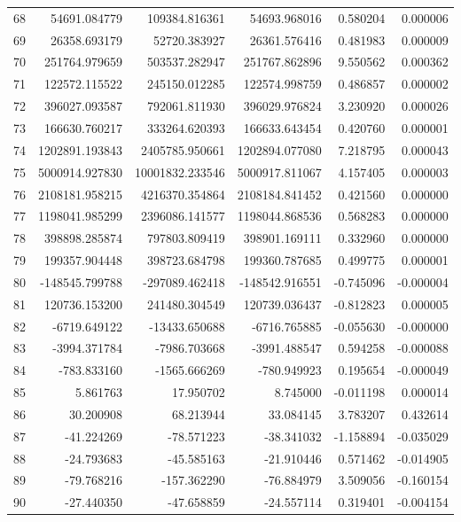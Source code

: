 \begin{tabular}{lrrrrr}
68 & 54691.084779 & 109384.816361 & 54693.968016 & 0.580204 & 0.000006 \\
69 & 26358.693179 & 52720.383927 & 26361.576416 & 0.481983 & 0.000009 \\
70 & 251764.979659 & 503537.282947 & 251767.862896 & 9.550562 & 0.000362 \\
71 & 122572.115522 & 245150.012285 & 122574.998759 & 0.486857 & 0.000002 \\
72 & 396027.093587 & 792061.811930 & 396029.976824 & 3.230920 & 0.000026 \\
73 & 166630.760217 & 333264.620393 & 166633.643454 & 0.420760 & 0.000001 \\
74 & 1202891.193843 & 2405785.950661 & 1202894.077080 & 7.218795 & 0.000043 \\
75 & 5000914.927830 & 10001832.233546 & 5000917.811067 & 4.157405 & 0.000003 \\
76 & 2108181.958215 & 4216370.354864 & 2108184.841452 & 0.421560 & 0.000000 \\
77 & 1198041.985299 & 2396086.141577 & 1198044.868536 & 0.568283 & 0.000000 \\
78 & 398898.285874 & 797803.809419 & 398901.169111 & 0.332960 & 0.000000 \\
79 & 199357.904448 & 398723.684798 & 199360.787685 & 0.499775 & 0.000001 \\
80 & -148545.799788 & -297089.462418 & -148542.916551 & -0.745096 & -0.000004 \\
81 & 120736.153200 & 241480.304549 & 120739.036437 & -0.812823 & 0.000005 \\
82 & -6719.649122 & -13433.650688 & -6716.765885 & -0.055630 & -0.000000 \\
83 & -3994.371784 & -7986.703668 & -3991.488547 & 0.594258 & -0.000088 \\
84 & -783.833160 & -1565.666269 & -780.949923 & 0.195654 & -0.000049 \\
85 & 5.861763 & 17.950702 & 8.745000 & -0.011198 & 0.000014 \\
86 & 30.200908 & 68.213944 & 33.084145 & 3.783207 & 0.432614 \\
87 & -41.224269 & -78.571223 & -38.341032 & -1.158894 & -0.035029 \\
88 & -24.793683 & -45.585163 & -21.910446 & 0.571462 & -0.014905 \\
89 & -79.768216 & -157.362290 & -76.884979 & 3.509056 & -0.160154 \\
90 & -27.440350 & -47.658859 & -24.557114 & 0.319401 & -0.004154 \\

\end{tabular}
